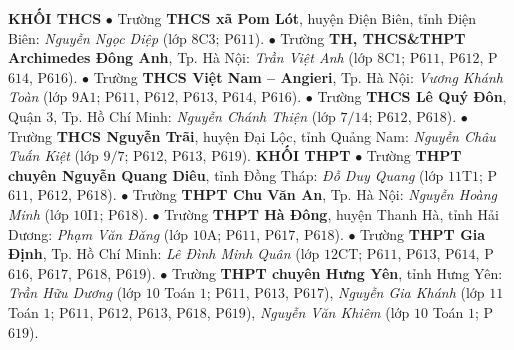 \begin{multicols}{2}
	\vskip 0.05cm
	\textbf{\color{thachthuctoanhoc}KHỐI THCS}
	\vskip 0.05cm
	$\bullet$ Trường \textbf{\color{thachthuctoanhoc}THCS xã Pom Lót}, huyện Điện Biên, tỉnh Điện Biên: \textit{Nguyễn Ngọc Diệp} (lớp $8$C$3$; P$611$).
	\vskip 0.05cm
	$\bullet$ Trường \textbf{\color{thachthuctoanhoc}TH, THCS\&THPT Archimedes Đông Anh}, Tp. Hà Nội:  \textit{Trần Việt Anh} (lớp $8$C$1$; P$611$, P$612$, P$614$, P$616$).
	\vskip 0.05cm
	$\bullet$ Trường \textbf{\color{thachthuctoanhoc}THCS Việt Nam -- Angieri}, Tp. Hà Nội: \textit{Vương Khánh Toàn} (lớp $9$A$1$; P$611$, P$612$, P$613$, P$614$, P$616$).
	\vskip 0.05cm
	$\bullet$ Trường \textbf{\color{thachthuctoanhoc}THCS Lê Quý Đôn}, Quận $3$, Tp. Hồ Chí Minh: \textit{Nguyễn Chánh Thiện} (lớp $7/14$; P$612$, P$618$).
	\vskip 0.05cm
	$\bullet$ Trường \textbf{\color{thachthuctoanhoc}THCS Nguyễn Trãi}, huyện Đại Lộc, tỉnh Quảng Nam: \textit{Nguyễn Châu Tuấn Kiệt} (lớp $9/7$; P$612$, P$613$, P$619$).
	\vskip 0.05cm
	\textbf{\color{thachthuctoanhoc}KHỐI THPT}
	\vskip 0.05cm
	$\bullet$ Trường \textbf{\color{thachthuctoanhoc}THPT chuyên Nguyễn Quang Diêu}, tỉnh Đồng Tháp: \textit{Đỗ Duy Quang} (lớp $11$T$1$; P$611$, P$612$, P$618$).
	\vskip 0.05cm
	$\bullet$ Trường \textbf{\color{thachthuctoanhoc}THPT Chu Văn An}, Tp. Hà Nội: \textit{Nguyễn Hoàng Minh} (lớp $10$I$1$; P$618$).
	\vskip 0.05cm
	$\bullet$ Trường \textbf{\color{thachthuctoanhoc}THPT Hà Đông}, huyện Thanh Hà, tỉnh Hải Dương: \textit{Phạm Văn Đăng} (lớp $10$A; P$611$, P$617$, P$618$).
	\vskip 0.05cm
	$\bullet$ Trường \textbf{\color{thachthuctoanhoc}THPT Gia Định}, Tp. Hồ Chí Minh: \textit{Lê Đình Minh Quân} (lớp $12$CT; P$611$, P$613$, P$614$, P$616$, P$617$, P$618$, P$619$).
	\vskip 0.05cm
	$\bullet$ Trường \textbf{\color{thachthuctoanhoc}THPT chuyên Hưng Yên}, tỉnh Hưng Yên: \textit{Trần Hữu Dương} (lớp $10$ Toán $1$; P$611$, P$613$, P$617$), \textit{Nguyễn Gia Khánh} (lớp $11$ Toán $1$; P$611$, P$612$, P$613$, P$618$, P$619$), \textit{Nguyễn Văn Khiêm} (lớp $10$ Toán $1$; P$619$).

\end{multicols}
